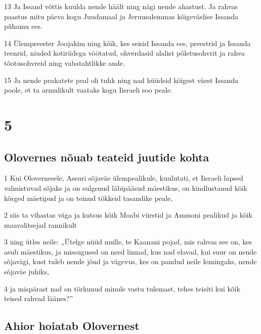 \par 13 Ja Issand võttis kuulda nende häält ning nägi nende ahastust. Ja rahvas paastus mitu päeva kogu Juudamaal ja Jeruusalemmas kõigeväelise Issanda pühamu ees.
\par 14 Ülempreester Joojakim ning kõik, kes seisid Issanda ees, preestrid ja Issanda teenrid, niuded kotiriidega vöötatud, ohverdasid alalist põletusohvrit ja rahva tõotusohvreid ning vabatahtlikke ande.
\par 15 Ja nende peakatete peal oli tuhk ning nad hüüdsid kõigest väest Issanda poole, et ta armulikult vaataks kogu Iisraeli soo peale.


\chapter{5}

\section*{Olovernes nõuab teateid juutide kohta}

\par 1 Kui Olovernesele, Assuri sõjaväe ülempealikule, kuulutati, et Iisraeli lapsed valmistuvad sõjaks ja on sulgenud läbipääsud mäestikus, on kindlustanud kõik kõrged mäetipud ja on teinud tõkkeid tasandike peale,
\par 2 siis ta vihastas väga ja kutsus kõik Moabi vürstid ja Ammoni pealikud ja kõik maavalitsejad rannikult
\par 3 ning ütles neile: „Ütelge nüüd mulle, te Kaanani pojad, mis rahvas see on, kes asub mäestikus, ja missugused on need linnad, kus nad elavad, kui suur on nende sõjavägi, kust tuleb nende jõud ja vägevus, kes on pandud neile kuningaks, nende sõjaväe juhiks,
\par 4 ja mispärast nad on tõrkunud minule vastu tulemast, tehes teisiti kui kõik teised rahvad läänes?”

\section*{Ahior hoiatab Olovernest}

